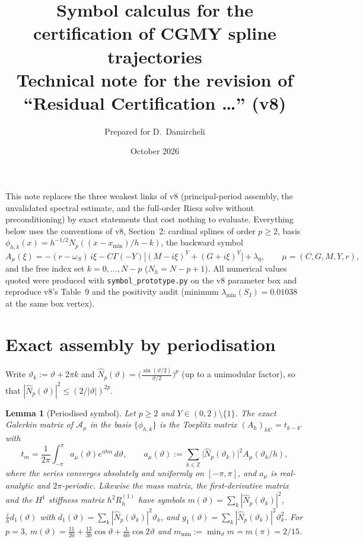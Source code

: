 \documentclass[11pt]{amsart}
\title{Symbol calculus for the certification of CGMY spline trajectories\\
\large Technical note for the revision of ``Residual Certification \dots'' (v8)}
\author{Prepared for D.~Damircheli}
\date{October 2026}
\newtheorem{lemma}[theorem]{Lemma}
\theoremstyle{remark}
\newcommand{\Z}{\mathbb Z}
\begin{document}
\maketitle

\noindent
This note replaces the three weakest links of v8 (principal-period
assembly, the unvalidated spectral estimate, and the full-order Riesz solve
without preconditioning) by exact statements that cost nothing to evaluate.
Everything below uses the conventions of v8, Section~2: cardinal splines of
order $p\ge2$, basis $\phi_{h,k}(x)=h^{-1/2}N_p((x-x_{\min})/h-k)$, the
backward symbol
\begin{equation}
 A_\mu(\xi)=-(r-\omega_S)\,i\xi-C\Gamma(-Y)\bigl[(M-i\xi)^Y+(G+i\xi)^Y\bigr]+\lambda_0,
 \qquad \mu=(C,G,M,Y,r),
 \label{eq:symbol}
\end{equation}
and the free index set $k=0,\dots,N-p$ ($N_h=N-p+1$).  All numerical values
quoted were produced with \texttt{symbol\_prototype.py} on the v8 parameter box
and reproduce v8's Table~9 and the positivity audit (minimum
$\lambda_{\min}(S_I)=0.01038$ at the same box vertex).

\section{Exact assembly by periodisation}

Write $\vartheta_k:=\vartheta+2\pi k$ and
$\widehat N_p(\vartheta)=\bigl(\tfrac{\sin(\vartheta/2)}{\vartheta/2}\bigr)^p$
(up to a unimodular factor), so that $|\widehat N_p(\vartheta)|^2\le(2/|\vartheta|)^{2p}$.

\begin{lemma}[Periodised symbol]\label{lem:periodisation}
Let $p\ge2$ and $Y\in(0,2)\setminus\{1\}$.  The exact Galerkin matrix of
$\mathcal A_\mu$ in the basis $\{\phi_{h,k}\}$ is the Toeplitz matrix
$(A_h)_{kk'}=t_{k-k'}$ with
\begin{equation}
 t_m=\frac1{2\pi}\int_{-\pi}^{\pi}a_\mu(\vartheta)e^{i\vartheta m}\,d\vartheta,
 \qquad
 a_\mu(\vartheta):=\sum_{k\in\Z}\bigl|\widehat N_p(\vartheta_k)\bigr|^2A_\mu(\vartheta_k/h),
 \label{eq:periodised}
\end{equation}
where the series converges absolutely and uniformly on $[-\pi,\pi]$, and
$a_\mu$ is real-analytic and $2\pi$-periodic.  Likewise the mass matrix,
the first-derivative matrix and the $H^1$ stiffness matrix $h^2R^{(1)}_h$
have symbols
$m(\vartheta)=\sum_k|\widehat N_p(\vartheta_k)|^2$,
$\tfrac{i}{h}d_1(\vartheta)$ with $d_1(\vartheta)=\sum_k|\widehat N_p(\vartheta_k)|^2\vartheta_k$,
and $g_1(\vartheta)=\sum_k|\widehat N_p(\vartheta_k)|^2\vartheta_k^2$.
For $p=3$, $m(\vartheta)=\tfrac{11}{20}+\tfrac{13}{30}\cos\vartheta+\tfrac1{60}\cos2\vartheta$
and $m_{\min}:=\min_\vartheta m=m(\pi)=2/15$.
\end{lemma}
\end{document}
